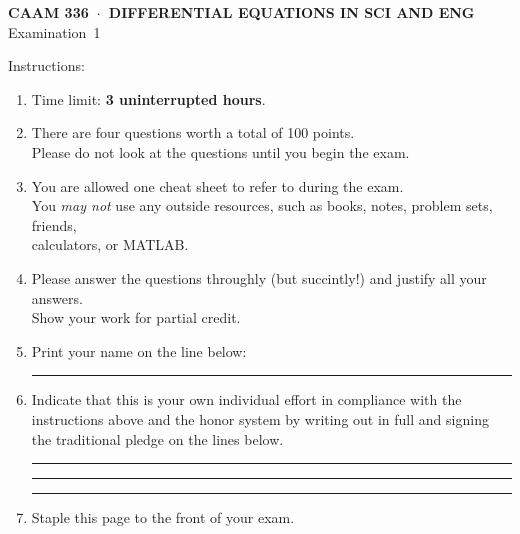 \documentclass[11pt]{article}
\begin{document}
\thispagestyle{empty}
\vspace*{0em}
   \begin{center}
      \textsf{\textbf{CAAM 336\ $\cdot$\ DIFFERENTIAL EQUATIONS IN SCI AND ENG}}\\[0.5em]
       \textsf{Examination~1}
   \end{center}
   
\vspace*{3em}
Instructions:
\begin{enumerate}
\item Time limit: \textbf{3 uninterrupted hours}.
\item There are four questions worth a total of 100 points.\\
      Please do not look at the questions until you begin the exam.
\item You are allowed one cheat sheet to refer to during the exam. \\
You \emph{may not} use any outside resources, such as books, notes, problem sets, friends,\\
      calculators, or MATLAB. 
\item Please answer the questions throughly (but succintly!) and justify all your answers.\\
      Show your work for partial credit.

\item Print your name on the line below:

\vspace*{1em}\rule{6in}{0.5pt}

\item Indicate that this is your own individual effort in compliance with 
      the instructions above and the honor system by writing out in full 
      and signing the traditional pledge on the lines below.

\vspace*{1em}\rule{6in}{0.5pt}

\vspace*{1em}\rule{6in}{0.5pt}

\vspace*{1em}\rule{6in}{0.5pt}

\item Staple this page to the front of your exam.

\end{enumerate}
\end{document}

